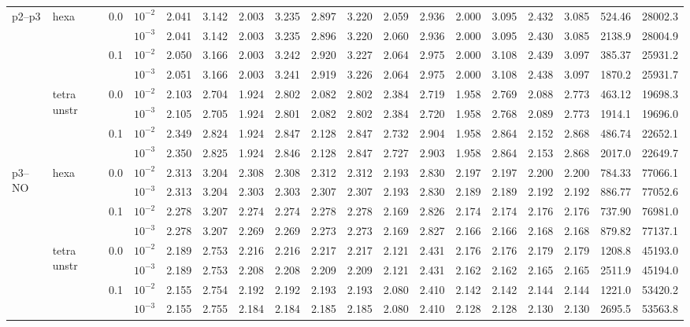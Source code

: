 \begin{longtable}{llclrrrrrrrrrrrrrr}
\multirow{8}{*}{p2--p3} & \multirow{4}{*}{hexa} & \multirow{2}{*}{0.0} & $10^{-2}$ & 2.041 & 3.142 & 2.003 & 3.235 & 2.897 & 3.220 & 2.059 & 2.936 & 2.000 & 3.095 & 2.432 & 3.085 & 524.46 & 28002.3 \\
& & & $10^{-3}$ & 2.041 & 3.142 & 2.003 & 3.235 & 2.896 & 3.220 & 2.060 & 2.936 & 2.000 & 3.095 & 2.430 & 3.085 & 2138.9 & 28004.9 \\\cline{3-18}
& & \multirow{2}{*}{0.1} & $10^{-2}$ & 2.050 & 3.166 & 2.003 & 3.242 & 2.920 & 3.227 & 2.064 & 2.975 & 2.000 & 3.108 & 2.439 & 3.097 & 385.37 & 25931.2 \\
& & & $10^{-3}$ & 2.051 & 3.166 & 2.003 & 3.241 & 2.919 & 3.226 & 2.064 & 2.975 & 2.000 & 3.108 & 2.438 & 3.097 & 1870.2 & 25931.7 \\\cline{2-18}
& \multirow{4}{*}{tetra unstr} & \multirow{2}{*}{0.0} & $10^{-2}$ & 2.103 & 2.704 & 1.924 & 2.802 & 2.082 & 2.802 & 2.384 & 2.719 & 1.958 & 2.769 & 2.088 & 2.773 & 463.12 & 19698.3 \\
& & & $10^{-3}$ & 2.105 & 2.705 & 1.924 & 2.801 & 2.082 & 2.802 & 2.384 & 2.720 & 1.958 & 2.768 & 2.089 & 2.773 & 1914.1 & 19696.0 \\\cline{3-18}
& & \multirow{2}{*}{0.1} & $10^{-2}$ & 2.349 & 2.824 & 1.924 & 2.847 & 2.128 & 2.847 & 2.732 & 2.904 & 1.958 & 2.864 & 2.152 & 2.868 & 486.74 & 22652.1 \\
& & & $10^{-3}$ & 2.350 & 2.825 & 1.924 & 2.846 & 2.128 & 2.847 & 2.727 & 2.903 & 1.958 & 2.864 & 2.153 & 2.868 & 2017.0 & 22649.7 \\\hline

\multirow{8}{*}{p3--NO} & \multirow{4}{*}{hexa} & \multirow{2}{*}{0.0} & $10^{-2}$ & 2.313 & 3.204 & 2.308 & 2.308 & 2.312 & 2.312 & 2.193 & 2.830 & 2.197 & 2.197 & 2.200 & 2.200 & 784.33 & 77066.1 \\
& & & $10^{-3}$ & 2.313 & 3.204 & 2.303 & 2.303 & 2.307 & 2.307 & 2.193 & 2.830 & 2.189 & 2.189 & 2.192 & 2.192 & 886.77 & 77052.6 \\\cline{3-18}
& & \multirow{2}{*}{0.1} & $10^{-2}$ & 2.278 & 3.207 & 2.274 & 2.274 & 2.278 & 2.278 & 2.169 & 2.826 & 2.174 & 2.174 & 2.176 & 2.176 & 737.90 & 76981.0 \\
& & & $10^{-3}$ & 2.278 & 3.207 & 2.269 & 2.269 & 2.273 & 2.273 & 2.169 & 2.827 & 2.166 & 2.166 & 2.168 & 2.168 & 879.82 & 77137.1 \\\cline{2-18}
& \multirow{4}{*}{tetra unstr} & \multirow{2}{*}{0.0} & $10^{-2}$ & 2.189 & 2.753 & 2.216 & 2.216 & 2.217 & 2.217 & 2.121 & 2.431 & 2.176 & 2.176 & 2.179 & 2.179 & 1208.8 & 45193.0 \\
& & & $10^{-3}$ & 2.189 & 2.753 & 2.208 & 2.208 & 2.209 & 2.209 & 2.121 & 2.431 & 2.162 & 2.162 & 2.165 & 2.165 & 2511.9 & 45194.0 \\\cline{3-18}
& & \multirow{2}{*}{0.1} & $10^{-2}$ & 2.155 & 2.754 & 2.192 & 2.192 & 2.193 & 2.193 & 2.080 & 2.410 & 2.142 & 2.142 & 2.144 & 2.144 & 1221.0 & 53420.2 \\
& & & $10^{-3}$ & 2.155 & 2.755 & 2.184 & 2.184 & 2.185 & 2.185 & 2.080 & 2.410 & 2.128 & 2.128 & 2.130 & 2.130 & 2695.5 & 53563.8 \\\hline


\end{longtable}
